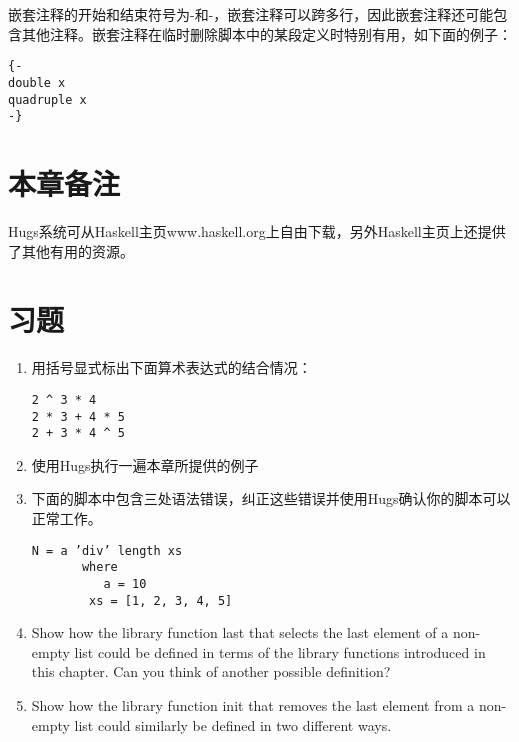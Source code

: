 嵌套注释的开始和结束符号为{-和-}，嵌套注释可以跨多行，因此嵌套注释还可能包含其他注释。嵌套注释在临时删除脚本中的某段定义时特别有用，如下面的例子：

\begin{verbatim}
{-
double x
quadruple x
-}
\end{verbatim}

\section{本章备注}
Hugs系统可从Haskell主页www.haskell.org上自由下载，另外Haskell主页上还提供了其他有用的资源。

\section{习题}

\begin{enumerate}
\item 用括号显式标出下面算术表达式的结合情况：
\begin{verbatim}
2 ^ 3 * 4
2 * 3 + 4 * 5 
2 + 3 * 4 ^ 5
\end{verbatim}

\item 使用Hugs执行一遍本章所提供的例子

\item
下面的脚本中包含三处语法错误，纠正这些错误并使用Hugs确认你的脚本可以正常工作。
\begin{verbatim}
N = a ’div’ length xs
       where
          a = 10
        xs = [1, 2, 3, 4, 5]
\end{verbatim}

\item Show how the library function last that selects the last element of a
non-empty list could be defined in terms of the library functions introduced
in this chapter. Can you think of another possible definition?

\item Show how the library function init that removes the last element from a
non-empty list could similarly be defined in two different ways.
\end{enumerate}
